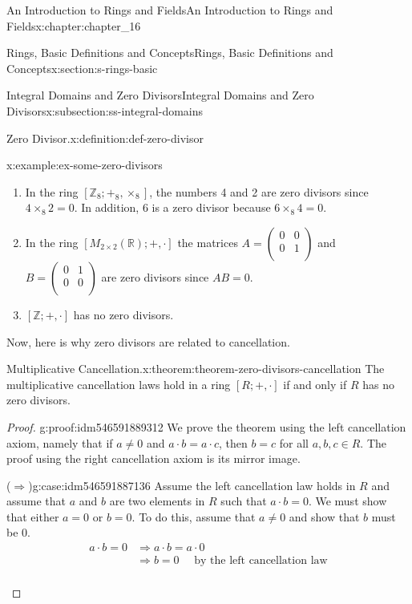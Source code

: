 \documentclass[oneside,10pt,]{book}
\newcommand{\forwardimplication}{($\Rightarrow$)}
\numberwithin{equation}{section}
\begin{document}
\begin{chapterptx}{An Introduction to Rings and Fields}{}{An Introduction to Rings and Fields}{}{}{x:chapter:chapter_16}
\begin{sectionptx}{Rings, Basic Definitions and Concepts}{}{Rings, Basic Definitions and Concepts}{}{}{x:section:s-rings-basic}
\begin{subsectionptx}{Integral Domains and Zero Divisors}{}{Integral Domains and Zero Divisors}{}{}{x:subsection:ss-integral-domains}
\begin{definition}{Zero Divisor.}{x:definition:def-zero-divisor}
\end{definition}
\begin{example}{}{x:example:ex-some-zero-divisors}%
%
\begin{enumerate}[label=(\alph*)]
\item{}In the ring \([\mathbb{Z}_8;+_8,\times_8]\), the numbers 4 and 2 are zero divisors since \(4 \times_8 2 =0\).  In addition, 6 is  a zero divisor because \(6\times_8 4 = 0\).%
\item{}In the ring \(\left[M_{2\times 2}(\mathbb{R}); +, \cdot \right]\) the matrices  \(A=\left(
\begin{array}{cc}
0 & 0 \\
0 & 1 \\
\end{array}
\right)\) and \(B=\left(
\begin{array}{cc}
0 & 1 \\
0 & 0 \\
\end{array}
\right)\) are zero divisors since \(A B = 0\).%
\item{}\([\mathbb{Z}; +, \cdot]\) has no zero divisors.%
\end{enumerate}
%
\end{example}
Now, here is why zero divisors are related to cancellation.%
\begin{theorem}{Multiplicative Cancellation.}{}{x:theorem:theorem-zero-divisors-cancellation}%
The multiplicative cancellation laws hold in a ring \([R; +, \cdot ]\) if and only if \(R\) has no zero divisors.%
\end{theorem}
\begin{proof}{}{g:proof:idm546591889312}
We prove the theorem using the left cancellation axiom, namely that if \(a \neq  0\) and \(a \cdot  b = a \cdot  c\), then \(b = c\) for all \(a, b, c\in R\). The proof using the right cancellation axiom is its mirror image.%
\begin{case}{\forwardimplication}{}{g:case:idm546591887136}
Assume the left cancellation law holds in \(R\) and assume that \(a\) and \(b\) are two elements in \(R\) such that \(a \cdot  b = 0\). We must show that either \(a = 0\) or \(b = 0\). To do this, assume that \(a \neq  0\) and show that \(b\) must be 0.%
\begin{equation*}
\begin{split}
a\cdot b = 0 &\Rightarrow a\cdot b = a\cdot 0\\
& \Rightarrow  b = 0\quad \textrm{ by the left cancellation law}\\

\end{split}
\end{equation*}
\end{case}
\end{proof}
\end{subsectionptx}
\end{sectionptx}
\end{chapterptx}
\end{document}
